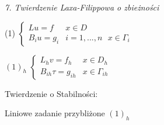 \textit{7. Twierdzenie Laxa-Filippowa o zbieżności}

(1) $\left\{\begin{matrix} Lu = f & x \in D \\ B_iu = g_i & i = 1,...,n\ \ \ x \in \Gamma _i \end{matrix}\right.$

$(1)_h$ $\left\{\begin{matrix} L_hv = f_h & x \in D_h \\ B_{ih} \tau = g_{ih} & x \in \Gamma _{ih} \end{matrix}\right.$

Twierdzenie o Stabilności:

Liniowe zadanie przybliżone $(1)_h$ 